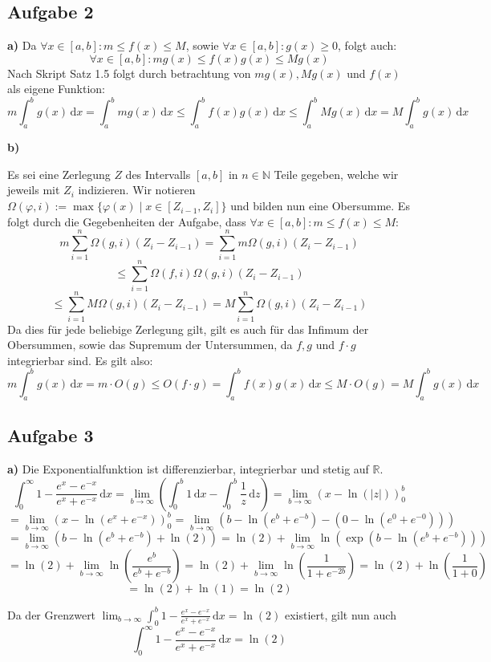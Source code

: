 \documentclass[a4paper,graphics,11pt]{article}
\newcommand{\aufgabe}[1]{\subsection*{Aufgabe #1}}
\begin{document}
\newpage

\aufgabe{2}
\textbf{a)}
Da $\forall x \in [a,b] \colon m \leq f(x) \leq M$, sowie $\forall x \in [a,b]\colon g(x) \geq 0$, folgt auch:
$$
	\forall x \in [a,b] \colon mg(x)\leq f(x)g(x) \leq Mg(x)
$$
Nach Skript Satz 1.5 folgt durch betrachtung von $mg(x), Mg(x)$ und $f(x)$ als eigene Funktion:
$$
	m\int_{a}^{b} g(x)\, \mathrm{d}x
	= \int_{a}^{b} mg(x)\, \mathrm{d}x
	\leq \int_{a}^{b} f(x)g(x)\, \mathrm{d}x
	\leq \int_{a}^{b} Mg(x)\, \mathrm{d}x
	= M\int_{a}^{b} g(x)\, \mathrm{d}x
$$

\textbf{b)}

Es sei eine Zerlegung $Z$ des Intervalls $[a,b]$ in $n \in \mathbb{N}$ Teile gegeben, welche wir jeweils
mit $Z_i$ indizieren.
Wir notieren $\Omega(\varphi, i) := \max\{\varphi(x) \mid x \in [Z_{i-1}, Z_i]\}$ und bilden nun eine Obersumme.
Es folgt durch die Gegebenheiten der Aufgabe, dass $\forall x \in [a,b]\colon m\leq f(x) \leq M \colon$
$$
	m \sum_{i=1}^{n} \Omega(g, i)(Z_i-Z_{i-1}) = \sum_{i=1}^{n} m\Omega(g,i)(Z_i-Z_{i-1})
$$$$
	\leq \sum_{i=1}^{n} \Omega(f,i)\Omega(g,i)(Z_i-Z_{i-1})
$$$$
	\leq \sum_{i=1}^{n} M\Omega(g,i)(Z_i-Z_{i-1}) = M \sum_{i=1}^{n} \Omega(g, i)(Z_i-Z_{i-1})
$$
Da dies für jede beliebige Zerlegung gilt, gilt es auch für das Infimum der Obersummen, sowie das Supremum
der Untersummen, da $f,g$ und $f\cdot g$ integrierbar sind. Es gilt also:
$$
	m\int_{a}^{b} g(x)\, \mathrm{d}x
	= m\cdot O(g)
	\leq O(f\cdot g)
	= \int_{a}^{b} f(x)g(x)\, \mathrm{d}x
	\leq M\cdot O(g)
	= M \int_{a}^{b} g(x)\, \mathrm{d}x
$$

\aufgabe{3}
\textbf{a)}
Die Exponentialfunktion ist differenzierbar, integrierbar und stetig auf $\mathbb{R}$.\\
$$
	\int_{0}^{\infty} 1-\frac{e^x-e^{-x}}{e^x+e^{-x}}\, \mathrm{d}x
	= \lim_{b \to \infty}\left( \int_{0}^{b} 1\, \mathrm{d}x -\int_0^b \frac{1}{z}\, \mathrm{d}z\right)
	= \lim_{b \to \infty}\left(x-\ln(|z|)\right)_0^b
$$$$
	= \lim_{b \to \infty}\left(x-\ln(e^x+e^{-x})\right)_0^b
	= \lim_{b \to \infty}\left(b-\ln(e^b+e^{-b}) - (0 -\ln(e^0+e^{-0}))\right)
$$$$
	= \lim_{b \to \infty}\left(b-\ln(e^b+e^{-b}) +\ln(2)\right)
	= \ln(2) + \lim_{b \to \infty} \ln\left(\exp\left(b-\ln(e^b+e^{-b})\right)\right)
$$$$
	= \ln(2) + \lim_{b \to \infty} \ln\left(\frac{e^b}{e^b+e^{-b}}\right)
	= \ln(2) + \lim_{b \to \infty} \ln\left(\frac{1}{1+e^{-2b}}\right)
	= \ln(2) + \ln\left(\frac{1}{1+0}\right)
$$$$
	= \ln(2) + \ln(1) = \ln(2)
$$

Da der Grenzwert $\displaystyle\lim_{b \to \infty} \int_{0}^{b} 1-\frac{e^x-e^{-x}}{e^x+e^{-x}}\, \mathrm{d}x = \ln(2)$
existiert, gilt nun auch
$$
	\int_{0}^{\infty} 1-\frac{e^x-e^{-x}}{e^x+e^{-x}}\, \mathrm{d}x = \ln(2)
$$
\end{document}
